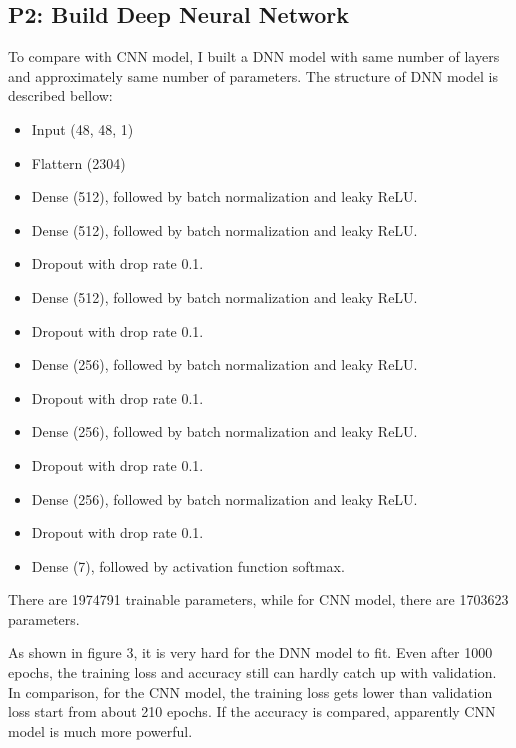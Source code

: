\documentclass[fleqn,a4paper,12pt]{article}
\begin{document}
\subsection*{P2: Build Deep Neural Network}

To compare with CNN model, I built a DNN model with same number of layers and approximately same number of parameters. The structure of DNN model is described bellow:

\begin{itemize}
\item Input (48, 48, 1)
\item Flattern (2304)
\item Dense (512), followed by batch normalization and leaky ReLU.
\item Dense (512), followed by batch normalization and leaky ReLU.
\item Dropout with drop rate 0.1.
\item Dense (512), followed by batch normalization and leaky ReLU.
\item Dropout with drop rate 0.1.
\item Dense (256), followed by batch normalization and leaky ReLU.
\item Dropout with drop rate 0.1.
\item Dense (256), followed by batch normalization and leaky ReLU.
\item Dropout with drop rate 0.1.
\item Dense (256), followed by batch normalization and leaky ReLU.
\item Dropout with drop rate 0.1.
\item Dense (7), followed by activation function softmax.
\end{itemize}

There are 1974791 trainable parameters, while for CNN model, there are 1703623 parameters.

As shown in figure 3, it is very hard for the DNN model to fit. Even after 1000 epochs, the training loss and accuracy still can hardly catch up with validation. In comparison, for the CNN model, the training loss gets lower than validation loss start from about 210 epochs. If the accuracy is compared, apparently CNN model is much more powerful. 
\end{document}
